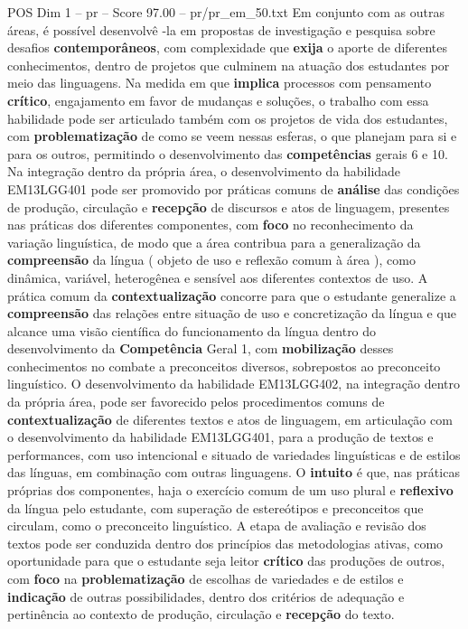 \begin{textsample}{POS Dim 1 – pr – Score 97.00 – pr/pr\_em\_50.txt}
Em conjunto com as outras áreas, é possível desenvolvê -la em propostas de investigação e pesquisa sobre desafios \textbf{contemporâneos}, com complexidade que \textbf{exija} o aporte de diferentes conhecimentos, dentro de projetos que culminem na atuação dos estudantes por meio das linguagens.
Na medida em que \textbf{implica} processos com pensamento \textbf{crítico}, engajamento em favor de mudanças e soluções, o trabalho com essa habilidade pode ser articulado também com os projetos de vida dos estudantes, com \textbf{problematização} de como se veem nessas esferas, o que planejam para si e para os outros, permitindo o desenvolvimento das \textbf{competências} gerais 6 e 10.
Na integração dentro da própria área, o desenvolvimento da habilidade EM13LGG401 pode ser promovido por práticas comuns de \textbf{análise} das condições de produção, circulação e \textbf{recepção} de discursos e atos de linguagem, presentes nas práticas dos diferentes componentes, com \textbf{foco} no reconhecimento da variação linguística, de modo que a área contribua para a generalização da \textbf{compreensão} da língua ( objeto de uso e reflexão comum à área ), como dinâmica, variável, heterogênea e sensível aos diferentes contextos de uso.
A prática comum da \textbf{contextualização} concorre para que o estudante generalize a \textbf{compreensão} das relações entre situação de uso e concretização da língua e que alcance uma visão científica do funcionamento da língua dentro do desenvolvimento da \textbf{Competência} Geral 1, com \textbf{mobilização} desses conhecimentos no combate a preconceitos diversos, sobrepostos ao preconceito linguístico.
O desenvolvimento da habilidade EM13LGG402, na integração dentro da própria área, pode ser favorecido pelos procedimentos comuns de \textbf{contextualização} de diferentes textos e atos de linguagem, em articulação com o desenvolvimento da habilidade EM13LGG401, para a produção de textos e performances, com uso intencional e situado de variedades linguísticas e de estilos das línguas, em combinação com outras linguagens.
O \textbf{intuito} é que, nas práticas próprias dos componentes, haja o exercício comum de um uso plural e \textbf{reflexivo} da língua pelo estudante, com superação de estereótipos e preconceitos que circulam, como o preconceito linguístico.
A etapa de avaliação e revisão dos textos pode ser conduzida dentro dos princípios das metodologias ativas, como oportunidade para que o estudante seja leitor \textbf{crítico} das produções de outros, com \textbf{foco} na \textbf{problematização} de escolhas de variedades e de estilos e \textbf{indicação} de outras possibilidades, dentro dos critérios de adequação e pertinência ao contexto de produção, circulação e \textbf{recepção} do texto.

\end{textsample}
